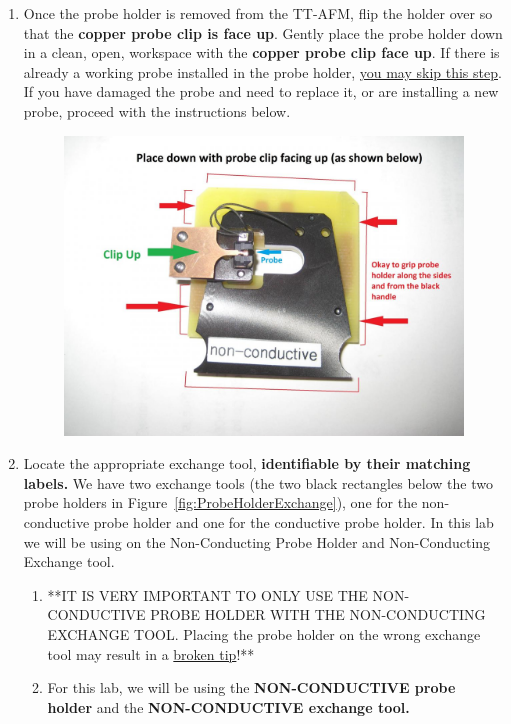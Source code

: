 \documentclass{../lab}
\begin{document}
\begin{enumerate}
    \item Once the probe holder is removed from the TT-AFM, flip the holder over so that the \textbf{copper probe clip is face up}. Gently place the probe holder down in a clean, open, workspace with the \textbf{copper probe clip face up}. If there is already a working probe installed in the probe holder, \hyperref[subsec:HowToPrepareASample]{you may skip this step}.  If you have damaged the probe and need to replace it, or are installing a new probe, proceed with the instructions below.

    \begin{figure}[H]
        \centering
        \href{http://experimentationlab.berkeley.edu/sites/default/files/AFMImages/15.JPG}{\includegraphics[width=0.8\linewidth]{images/15.JPG}}
        \caption{}
        \label{fig:YellowSlideDescription}
    \end{figure}
    
    \item Locate the appropriate exchange tool, \textbf{identifiable by their matching labels.} We have two exchange tools (the two black rectangles below the two probe holders in Figure~\ref{fig:ProbeHolderExchange}), one for the non-conductive probe holder and one for the conductive probe holder. In this lab we will be using on the Non-Conducting Probe Holder and Non-Conducting Exchange tool.
    \begin{enumerate}
        \item **IT IS VERY IMPORTANT TO ONLY USE THE NON-CONDUCTIVE PROBE HOLDER WITH THE NON-CONDUCTING EXCHANGE TOOL.  Placing the probe holder on the wrong exchange tool may result in a \hyperref[subsec:BrokenTip]{broken tip}!**

        \item For this lab, we will be using the \textbf{NON-CONDUCTIVE probe holder} and the \textbf{NON-CONDUCTIVE exchange tool.}
    \end{enumerate}


\end{enumerate}
\end{document}
